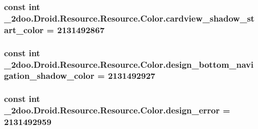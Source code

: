 \hypertarget{class__2doo_1_1_droid_1_1_resource_1_1_color_52857db6b354c99477327cfca58d7ae2}{
\subsubsection[{cardview\_\-shadow\_\-start\_\-color}]{\setlength{\rightskip}{0pt plus 5cm}const int \_\-2doo.Droid.Resource.Resource.Color.cardview\_\-shadow\_\-start\_\-color = 2131492867}}
\label{class__2doo_1_1_droid_1_1_resource_1_1_color_52857db6b354c99477327cfca58d7ae2}


\hypertarget{class__2doo_1_1_droid_1_1_resource_1_1_color_0f514aa9b39a8341bc615f5be23a2d95}{
\subsubsection[{design\_\-bottom\_\-navigation\_\-shadow\_\-color}]{\setlength{\rightskip}{0pt plus 5cm}const int \_\-2doo.Droid.Resource.Resource.Color.design\_\-bottom\_\-navigation\_\-shadow\_\-color = 2131492927}}
\label{class__2doo_1_1_droid_1_1_resource_1_1_color_0f514aa9b39a8341bc615f5be23a2d95}


\hypertarget{class__2doo_1_1_droid_1_1_resource_1_1_color_e8393b20aadf0fd8d25c7ddd66730a27}{
\subsubsection[{design\_\-error}]{\setlength{\rightskip}{0pt plus 5cm}const int \_\-2doo.Droid.Resource.Resource.Color.design\_\-error = 2131492959}}
\label{class__2doo_1_1_droid_1_1_resource_1_1_color_e8393b20aadf0fd8d25c7ddd66730a27}


